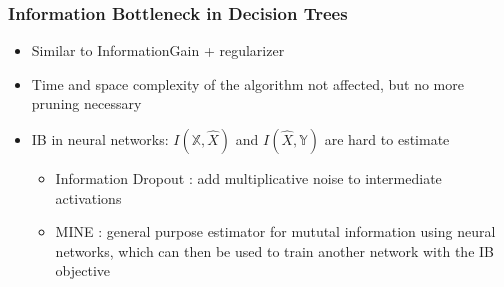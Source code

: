 \begin{frame}
\frametitle{Information Bottleneck in Decision Trees}
    \begin{itemize}
        \item Similar to InformationGain + regularizer
        \item Time and space complexity of the algorithm not affected, but no more pruning necessary
        \item IB in neural networks: $I(\mathbb{X}, \hat{X})$ and $I(\hat{X}, \mathbb{Y})$ are hard to estimate
        \begin{itemize}
            \item Information Dropout \cite{achille_information_2017}: add multiplicative noise to intermediate activations
            \item MINE \cite{belghazi_mine_2018}: general purpose estimator for mututal information using neural networks, which can then be used to train another network with the IB objective
        \end{itemize}
    \end{itemize}


\end{frame}